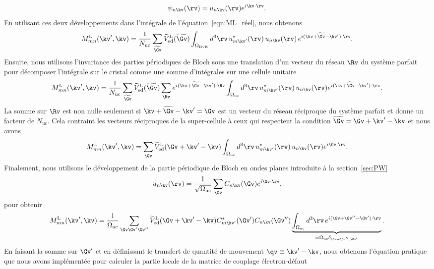 \begin{equation}
    \psi_{n\kv}(\rv) = u_{n\kv}(\rv)e^{i\kv\cdot\rv}.
\end{equation}
En utilisant ces deux développements dans l'intégrale de l'équation~\eqref{eqn:ML_réel}, nous obtenons
\begin{equation}
    M^\text{L}_{mn}(\kv',\kv) = \frac{1}{N_\text{uc}}\sum_{\widetilde{\Gv}}\widetilde{V}_\text{ed}^\text{L}(\widetilde{\Gv})\int_{\Omega_\text{BvK}}d^3\rv\,u^*_{m\kv'}(\rv)\,u_{n\kv}(\rv)\,e^{i(\kv+\widetilde{\Gv}-\kv')\cdot\rv}.
\end{equation}
Ensuite, nous utilisons l'invariance des parties périodiques de Bloch sous une translation d'un vecteur du réseau $\Rv$ du système parfait pour décomposer l'intégrale sur le cristal comme une somme d'intégrales sur une cellule unitaire
\begin{equation}
    M^\text{L}_{mn}(\kv',\kv) = \frac{1}{N_\text{uc}}\sum_{\widetilde{\Gv}}\widetilde{V}_\text{ed}^\text{L}(\widetilde{\Gv})\sum_\Rv e^{i(\kv+\widetilde{\Gv}-\kv')\cdot\Rv}\int_{\Omega_\text{uc}} d^3\rv\,u_{m\kv'}^*(\rv)\,u_{n\kv}(\rv)e^{i(\kv+\widetilde{\Gv}-\kv')\cdot\rv}.
\end{equation}
La somme sur $\Rv$ est non nulle seulement si $\kv+\widetilde{\Gv}-\kv' = \Gv$ est un vecteur du réseau réciproque du système parfait et donne un facteur de $N_\text{uc}$. Cela contraint les vecteurs réciproques de la super-cellule à ceux qui respectent la condition $\widetilde{\Gv}=\Gv+\kv'-\kv$ et nous avons
\begin{equation}
    M^\text{L}_{mn}(\kv',\kv) = \sum_{\Gv}\widetilde{V}_\text{ed}^\text{L}(\Gv+\kv'-\kv)\int_{\Omega_\text{uc}} d^3\rv\,u_{m\kv'}^*(\rv)\,u_{n\kv}(\rv)e^{i\Gv\cdot\rv}.
\end{equation}
Finalement, nous utilisons le développement de la partie périodique de Bloch en ondes planes introduite à la section~\ref{sec:PW}
\begin{equation}
    u_{n\kv}(\rv) = \frac{1}{\sqrt{\Omega_\text{uc}}}\sum_\Gv C_{n\kv}(\Gv)e^{i\Gv\cdot\rv},
\end{equation}
pour obtenir
\begin{equation}
     M^\text{L}_{mn}(\kv',\kv) = \frac{1}{\Omega_\text{uc}}\sum_{\Gv\Gv'\Gv''}\widetilde{V}_\text{ed}^\text{L}(\Gv+\kv'-\kv)C_{m\kv'}^*(\Gv')C_{n\kv}(\Gv'')\underbrace{\int_{\Omega_\text{uc}} d^3\rv\,e^{i(\Gv+\Gv''-\Gv')\cdot\rv}}_{=\Omega_\text{uc}\delta_{\Gv+\Gv'',\Gv'}}.
\end{equation}
En faisant la somme sur $\Gv'$ et en définissant le transfert de quantité de mouvement $\qv\equiv\kv'-\kv$, nous obtenons l'équation pratique que nous avons implémentée pour calculer la partie locale de la matrice de couplage électron-défaut
